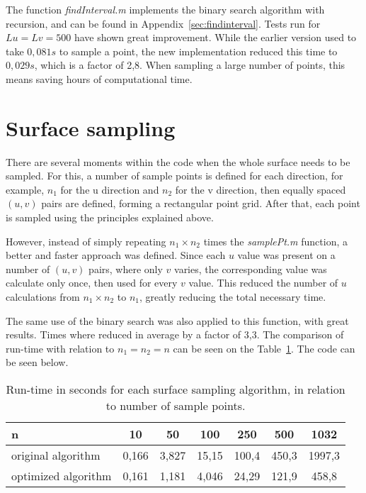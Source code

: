 	The function \textit{findInterval.m} implements the binary search algorithm with recursion, and can be found in Appendix~\ref{sec:findinterval}. Tests run for $Lu=Lv=500$ have shown great improvement. While the earlier version used to take $0,081 s$ to sample a point, the new implementation reduced this time to $0,029 s$, which is a factor of 2,8. When sampling a large number of points, this means saving hours of computational time.
	
	\section{Surface sampling}
	
	There are several moments within the code when the whole surface needs to be sampled. For this, a number of sample points is defined for each direction, for example, $n_1$ for the u direction and $n_2$ for the v direction, then equally spaced $(u,v)$ pairs are defined, forming a rectangular point grid. After that, each point is sampled using the principles explained above.
	
	However, instead of simply repeating $n_1 \times n_2$ times the \textit{samplePt.m} function, a better and faster approach was defined. Since each $u$ value was present on a number of $(u,v)$ pairs, where only $v$ varies, the corresponding value was calculate only once, then used for every $v$ value. This reduced the number of $u$ calculations from $n_1 \times n_2$ to $n_1$, greatly reducing the total necessary time.
	
	The same use of the binary search was also applied to this function, with great results. Times where reduced in average by a factor of 3,3. The comparison of run-time with relation to $n_1=n_2=n$ can be seen on the Table~\ref{tab:samplesurf}. The code can be seen below.\newline
	
	\begin{table}[H]
	\centering
	\captionsetup{justification=centering}
	\begin{tabular}{l c c c c c c}
	\hline
	n & 10 & 50 & 100 & 250 & 500 & 1032\\\hline
	original algorithm & 0,166 & 3,827 & 15,15 & 100,4 & 450,3 & 1997,3\\
	optimized algorithm & 0,161 & 1,181 & 4,046 & 24,29 & 121,9 & 458,8\\
	\hline
	\end{tabular}
	\caption{Run-time in seconds for each surface sampling algorithm, in relation to number of sample points.}
	\label{tab:samplesurf}
	\end{table}
	
